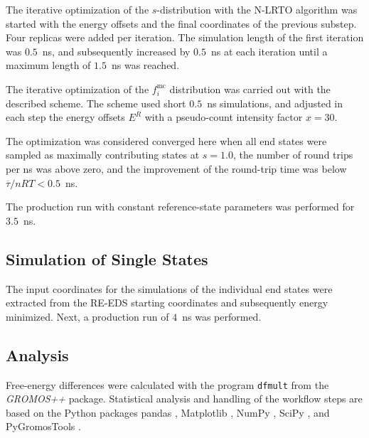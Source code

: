 The iterative optimization of the $s$-distribution with the N-LRTO \cite{Sidler2017} algorithm was started with the energy offsets and the final coordinates of the previous substep.
Four replicas were added per iteration. 
The simulation length of the first iteration was $0.5$~ns, and subsequently increased by $0.5$~ns at each iteration until a maximum length of $1.5$~ns was reached.

The iterative optimization of the $f_i^{\text{mc}}$ distribution was carried out with the described scheme.
The scheme used short $0.5$~ns simulations, and adjusted in each step the energy offsets $E^R$ with a pseudo-count intensity factor $x = 30$.

The optimization was considered converged here when all end states were sampled as maximally contributing states at $s=1.0$, the number of round trips per ns was above zero, and the improvement of the round-trip time was below $\overline{\tau}/nRT < 0.5$~ns.

The production run with constant reference-state parameters was performed for $3.5$~ns.

\subsection{Simulation of Single States}
The input coordinates for the simulations of the individual end states were extracted from the RE-EDS starting coordinates and subsequently energy minimized. Next, a production run of $4$~ns was performed. 

\subsection{Analysis}
Free-energy differences were calculated with the program {\tt{dfmult}} from the \textit{GROMOS++} \cite{Eichenberger2011} package.
Statistical analysis and handling of the workflow steps are based on the Python packages pandas \cite{Mckinney2010}, Matplotlib \cite{Hunter2007}, NumPy \cite{Vanderwalt2011}, SciPy \cite{Virtanen2020}, and PyGromosTools \cite{Ries2021}.

\FloatBarrier